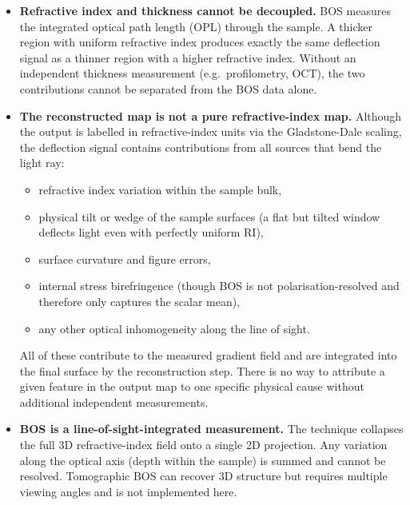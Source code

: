 \documentclass[11pt]{article}
\begin{document}
\begin{itemize}

  \item \textbf{Refractive index and thickness cannot be decoupled.}
        BOS measures the integrated optical path length (OPL) through the
        sample. A thicker region with uniform refractive index produces
        exactly the same deflection signal as a thinner region with a
        higher refractive index. Without an independent thickness
        measurement (e.g.\ profilometry, OCT), the two contributions
        cannot be separated from the BOS data alone.

  \item \textbf{The reconstructed map is not a pure refractive-index map.}
        Although the output is labelled in refractive-index units via the
        Gladstone-Dale scaling, the deflection signal contains contributions
        from all sources that bend the light ray:
        \begin{itemize}[noitemsep]
          \item refractive index variation within the sample bulk,
          \item physical tilt or wedge of the sample surfaces (a flat but
                tilted window deflects light even with perfectly uniform RI),
          \item surface curvature and figure errors,
          \item internal stress birefringence (though BOS is not
                polarisation-resolved and therefore only captures the
                scalar mean),
          \item any other optical inhomogeneity along the line of sight.
        \end{itemize}
        All of these contribute to the measured gradient field and are
        integrated into the final surface by the reconstruction step. There
        is no way to attribute a given feature in the output map to one
        specific physical cause without additional independent measurements.

  \item \textbf{BOS is a line-of-sight-integrated measurement.}
        The technique collapses the full 3D refractive-index field onto a
        single 2D projection. Any variation along the optical axis (depth
        within the sample) is summed and cannot be resolved. Tomographic
        BOS can recover 3D structure but requires multiple viewing angles
        and is not implemented here.


\end{itemize}
\end{document}
